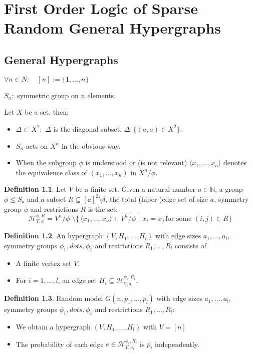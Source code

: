 \documentclass[11pt,notitlepage]{report}
\theoremstyle{definition}
\newtheorem{definition}{Definition}[chapter]
\theoremstyle{remark}
\newcommand{\N}{\mathbb{N}}
\newcommand{\vlst}[2]{#1_1,\dots, #1_{#2}}
\begin{document}
\chapter{First Order Logic of Sparse Random General Hypergraphs}

\section{General Hypergraphs}

$\forall n\in N: \quad [n]:= \{1,\dots, n\}$\par
$S_n:$ symmetric group on $n$ elements. \par
Let $X$ be a set, then:
\begin{itemize}
	\item $\Delta\subset X^2:$ $\Delta$ is the diagonal subset. $\Delta: \{(a,a)\in X^2 \}$.
	\item $S_n$ acts on $X^n$ in the obvious way. 
	\item When the subgroup $\phi$ is understood or (is not relevant) $\langle x_1,\dots,x_n\rangle$
	denotes the equivalence class of $(\vlst{x}{n})$ in $X^n/\phi$.
\end{itemize}
\par


\begin{definition}
	Let $V$ be a finite set. Given a natural number $a\in \N$, a group $\phi\leq S_a$ and a subset
	$R\subseteq [a]^2 \setminus \delta$, the total (hiper-)edge set of size $a$, symmetry group $\phi$ and
	restrictions $R$ is the set:
	\[ \mathcal{H}_{V,a}^{\phi,R}= V^n/\phi \, \, \setminus \{\,  \langle 
	x_1, \dots,x_n\rangle
	 \in V^n/\phi  \, \, | \, \, x_i=x_j \, \text{for some } (i,j)\in R \} \]
	
\end{definition}

\begin{definition}
	An hypergraph $(V,H_1,\dots, H_l)$ with edge sizes $a_1,\dots,a_l$, 
	symmetry groups $\phi_1,dots,\phi_1$ and restrictions $R_1,\dots,R_l$ consists of
	\begin{itemize}
		\item A finite vertex set $V$.
		\item For $i=1,\dots,l$, an edge set $H_i\subseteq \mathcal{H}_{V,a_i}^{\phi_i,R_i}$.
	\end{itemize}
\end{definition}

\begin{definition} 
	Random model $G(n, p_1,\dots, p_l)$ with edge sizes $a_1,\dots,a_l$, 
	symmetry groups $\phi_1,dots,\phi_1$ and restrictions $R_1,\dots,R_l$:
	\begin{itemize}
		\item We obtain a hypergraph $(V,H_1,\dots, H_l)$ with $V=[n]$
		\item The probability of each edge $e\in \mathcal{H}_{V,a_i}^{\phi_i,R_i}$
		is $p_i$ independently. 
	\end{itemize}
\end{definition}
\end{document}
